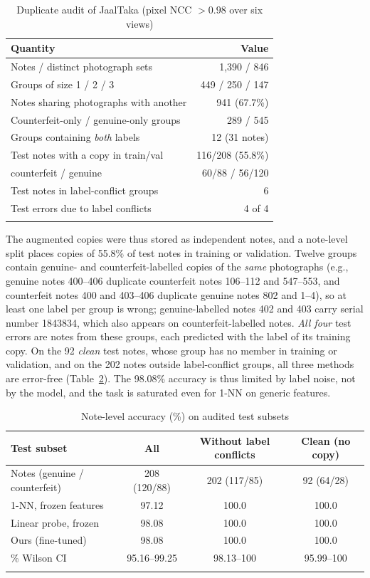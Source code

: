 \documentclass[pdflatex,iicol,sn-mathphys-num]{sn-jnl}
\begin{document}
\begin{table}[!t]
\caption{Duplicate audit of JaalTaka (pixel NCC $>0.98$ over six views)}\label{tab:audit}
\footnotesize
\begin{tabular*}{\columnwidth}{@{\extracolsep\fill}lr}
\toprule
Quantity & Value \\
\midrule
Notes / distinct photograph sets & 1{,}390 / 846 \\
Groups of size 1 / 2 / 3 & 449 / 250 / 147 \\
Notes sharing photographs with another & 941 (67.7\%) \\
Counterfeit-only / genuine-only groups & 289 / 545 \\
Groups containing \emph{both} labels & 12 (31 notes) \\
\midrule
Test notes with a copy in train/val & 116/208 (55.8\%) \\
\quad counterfeit / genuine & 60/88 / 56/120 \\
Test notes in label-conflict groups & 6 \\
Test errors due to label conflicts & 4 of 4 \\
\botrule
\end{tabular*}
\end{table}

The augmented copies were thus stored as independent notes, and a note-level split
places copies of 55.8\% of test notes in training or validation. Twelve groups contain
genuine- and counterfeit-labelled copies of the \emph{same} photographs (e.g., genuine
notes 400--406 duplicate counterfeit notes 106--112 and 547--553, and counterfeit notes
400 and 403--406 duplicate genuine notes 802 and 1--4), so at least one label per group
is wrong; genuine-labelled notes 402 and 403 carry serial number 1843834, which also
appears on counterfeit-labelled notes. \emph{All four} test errors are notes from these
groups, each predicted with the label of its training copy. On the 92 \emph{clean} test
notes, whose group has no member in training or validation, and on the 202 notes outside
label-conflict groups, all three methods are error-free (Table~\ref{tab:clean}). The
98.08\% accuracy is thus limited by label noise, not by the model, and the task is
saturated even for 1-NN on generic features.

\begin{table}[!t]
\caption{Note-level accuracy (\%) on audited test subsets}\label{tab:clean}
\begin{tabular*}{\textwidth}{@{\extracolsep\fill}lccc}
\toprule
Test subset & All & Without label conflicts & Clean (no copy) \\
\midrule
Notes (genuine / counterfeit) & 208 (120/88) & 202 (117/85) & 92 (64/28) \\
\midrule
1-NN, frozen features & 97.12 & 100.0 & 100.0 \\
Linear probe, frozen & 98.08 & 100.0 & 100.0 \\
Ours (fine-tuned) & 98.08 & 100.0 & 100.0 \\
\quad 95\% Wilson CI & 95.16--99.25 & 98.13--100 & 95.99--100 \\
\botrule
\end{tabular*}
\end{table}
\end{document}
